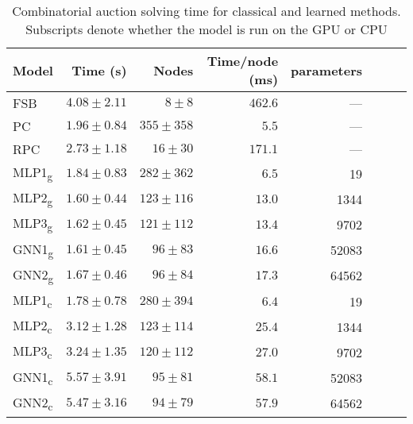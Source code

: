 \begin{scriptsize}
\begin{table}[ht]
	\centering
	\begin{tabular}{lrrrrrrr}
	    \toprule
		Model & Time (s) & Nodes  & Time/node (ms) & parameters \\
		\midrule
		FSB & $4.08 \pm 2.11$ & $8 \pm 8$  & $462.6$ & --- \\
		PC  & $1.96 \pm 0.84$ & $355 \pm 358$ & $5.5$ & ---\\
		RPC & $2.73 \pm 1.18$ & $16 \pm 30$ & $ 171.1$ & ---\\
		\addlinespace
		MLP1\textsubscript{g} & $1.84 \pm 0.83$ & $282 \pm 362$ & $6.5$  & 19\\
		MLP2\textsubscript{g} & $\mathbf{1.60 \pm 0.44}$ & $123 \pm 116$ & $13.0$ & 1344\\
		MLP3\textsubscript{g} & $1.62 \pm 0.45$ & $121 \pm 112$ & $13.4$ & 9702\\
		GNN1\textsubscript{g} & $1.61 \pm   0.45$ & $96 \pm   83$   & $16.6$ & 52083\\
		GNN2\textsubscript{g} & $  1.67 \pm   0.46$ &  $  96 \pm   84$ &  $  17.3$ & 64562\\
		\addlinespace
		MLP1\textsubscript{c} & $1.78 \pm 0.78$ & $280 \pm 394$ & $6.4$  & 19\\
		MLP2\textsubscript{c} & $3.12 \pm 1.28$ & $123 \pm 114$ & $25.4$ & 1344\\
		MLP3\textsubscript{c} & $3.24 \pm 1.35$ & $120 \pm 112$ & $27.0$ & 9702\\
		GNN1\textsubscript{c} & $  5.57 \pm   3.91$ &  $  95 \pm   81$ &  $  58.1$ & 52083\\
		GNN2\textsubscript{c} & $  5.47 \pm   3.16$ &  $  94 \pm   79$ &  $  57.9$ & 64562\\
		\bottomrule
	\end{tabular}
	\caption{Combinatorial auction solving time for classical and learned methods. Subscripts denote whether the model is run on the \gls{GPU} or \gls{CPU}}\label{tab:results1_cauction}
\end{table}


\end{scriptsize}
